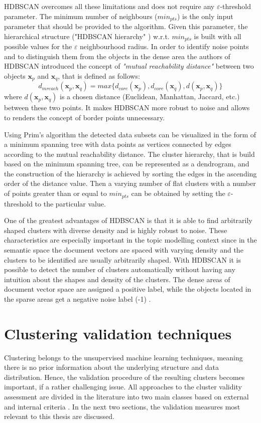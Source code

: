\documentclass[fontsize=12pt,a4paper,twoside,openany]{scrbook}
\begin{document}
HDBSCAN overcomes all these limitations and does not require any \(\varepsilon\)-threshold parameter. The minimum number of neighbours (\(min_{pts}\)) is the only input parameter that should be provided to the algorithm. Given this parameter, the hierarchical structure ("HDBSCAN hierarchy" \parencite{Campello13}) w.r.t. \(min_{pts}\) is built with all possible values for the \(\varepsilon\) neighbourhood radius. In order to identify noise points and to distinguish them from the objects in the dense area the authors of HDBSCAN introduced the concept of \emph{"mutual reachability distance"} \parencite[p.~163]{Campello13} between two objects \(\textbf{x}_p\) and \(\textbf{x}_q\), that is defined as follows: \[d_{mreach}(\textbf{x}_p, \textbf{x}_q) = max\{d_{core}(\textbf{x}_p), d_{core}(\textbf{x}_q), d(\textbf{x}_p, \textbf{x}_q)\}\] 
where \(d(\textbf{x}_p, \textbf{x}_q)\) is a chosen distance (Euclidean, Manhattan, Jaccard, etc.) between these two points. It makes HDBSCAN more robust to noise and allows to renders the concept of border points unnecessary. 

Using Prim's algorithm \parencite{Mamun16} the detected data subsets can be visualized in the form of a minimum spanning tree with data points as vertices connected by edges according to the mutual reachability distance. The cluster hierarchy, that is build based on the minimum spanning tree, can be represented as a dendrogram, and the construction of the hierarchy is achieved by sorting the edges in the ascending order of the distance value. Then a varying number of flat clusters with a number of points greater than or equal to \(min_{pts}\) can be obtained by setting the \(\varepsilon\)-threshold to the particular value.

One of the greatest advantages of HDBSCAN is that it is able to find arbitrarily shaped clusters with diverse density and is highly robust to noise. These characteristics are especially important in the topic modelling context since in the semantic space the document vectors are spaced with varying density \parencite{Angelov20} and the clusters to be identified are usually arbitrarily shaped. With HDBSCAN it is possible to detect the number of clusters automatically without having any intuition about the shapes and density of the clusters. The dense areas of document vector space are assigned a positive label, while the objects located in the sparse areas get a negative noise label (-1) \parencite{Angelov20}.

\section{Clustering validation techniques}
\label{sec:validation}
Clustering belongs to the unsupervised machine learning techniques, meaning there is no prior information about the underlying structure and data distribution. Hence, the validation procedure of the resulting clusters becomes important, if a rather challenging issue. All approaches to the cluster validity assessment are divided in the literature into two main classes based on external and internal criteria \parencite{Halkidi01a}. In the next two sections, the validation measures most relevant to this thesis are discussed.
\end{document}
